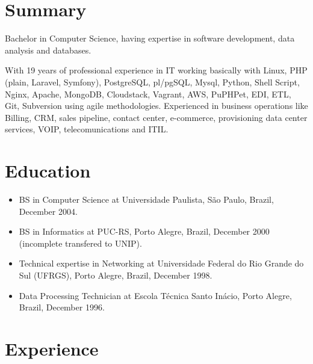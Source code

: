 \documentclass[margin]{res}
\begin{document}
  

\address{São Paulo, Brazil \\ andre.reis@gmail.com \\ Phone: +55 11 993289258 }
                           
                        
\begin{resume}                        
 
\section{Summary} Bachelor in Computer Science, having expertise in software development, data analysis and databases.
                        
                  With 19 years of professional experience in IT working basically with Linux, PHP (plain, Laravel, Symfony), PostgreSQL, pl/pgSQL, Mysql, Python, Shell Script, Nginx, Apache, MongoDB, Cloudstack, Vagrant, AWS, PuPHPet, EDI, ETL, Git, Subversion using agile methodologies. Experienced in business operations like Billing, CRM, sales pipeline, contact center, e-commerce, provisioning data center services, VOIP, telecomunications and ITIL.
 
\section{Education}	
  \begin{itemize}
    \item BS in Computer Science at Universidade Paulista, São Paulo, Brazil, December 2004.
    \item BS in Informatics at PUC-RS, Porto Alegre, Brazil, December 2000 (incomplete transfered to UNIP).
    \item Technical expertise in Networking at Universidade Federal do Rio Grande do Sul (UFRGS), Porto Alegre, Brazil, December 1998.
    \item Data Processing Technician at Escola Técnica Santo Inácio, Porto Alegre, Brazil, December 1996.
\end{itemize}

\section{Experience}


\end{resume}
\end{document}
